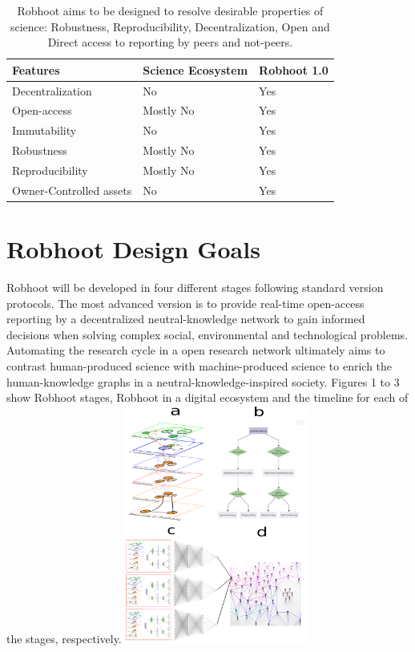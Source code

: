 \documentclass[10pt, a4paper, twocolumn]{article} %
\begin{document}
{\begin{table}
\begin{tabular}{ p{3cm} | p{2cm} | p{2cm}}
  \hline \hline
  \textbf{Features} & \textbf{Science Ecosystem} &\textbf{Robhoot 1.0}\\  \hline
  Decentralization & No & Yes \\ \hline
  Open-access & Mostly No & Yes \\ \hline
  Immutability & No & Yes \\ \hline
  Robustness & Mostly No & Yes \\ \hline
  Reproducibility & Mostly No & Yes \\ \hline        
  Owner-Controlled assets & No & Yes \\ \hline       
  \bottomrule

\end{tabular}
\caption{Robhoot aims to be designed to resolve desirable properties
  of science: Robustness, Reproducibility, Decentralization, Open and
  Direct access to reporting by peers and not-peers.}
\end{table}
  \section{Robhoot Design Goals}
  Robhoot will be developed in four different stages following
  standard version protocols. The most advanced version is to provide
  real-time open-access reporting by a decentralized neutral-knowledge
  network to gain informed decisions when solving complex social,
  environmental and technological problems. Automating the research
  cycle in a open research network ultimately aims to contrast
  human-produced science with machine-produced science to enrich the
  human-knowledge graphs in a neutral-knowledge-inspired
  society. Figures 1 to 3 show Robhoot stages, Robhoot in a digital
  ecosystem and the timeline for each of the stages, respectively.
  \includegraphics[width=0.45\textwidth]{Figure1.pdf}

}
\end{document}
